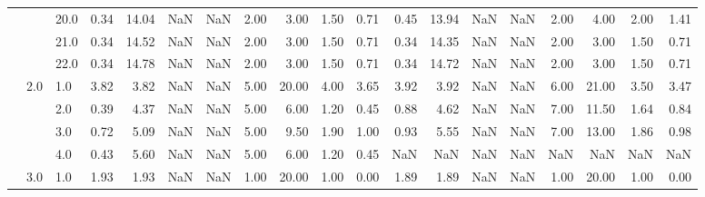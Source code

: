 \begin{tabular}{lllrrrrrrrrrrrrrrrr}
       &     & 20.0 &      0.34 &      14.04 &               NaN &                NaN & 2.00 &   3.00 &             1.50 &                         0.71 &      0.45 &      13.94 &               NaN &                NaN & 2.00 &   4.00 &             2.00 &                         1.41 \\
       &     & 21.0 &      0.34 &      14.52 &               NaN &                NaN & 2.00 &   3.00 &             1.50 &                         0.71 &      0.34 &      14.35 &               NaN &                NaN & 2.00 &   3.00 &             1.50 &                         0.71 \\
       &     & 22.0 &      0.34 &      14.78 &               NaN &                NaN & 2.00 &   3.00 &             1.50 &                         0.71 &      0.34 &      14.72 &               NaN &                NaN & 2.00 &   3.00 &             1.50 &                         0.71 \\
       & 2.0 & 1.0  &      3.82 &       3.82 &               NaN &                NaN & 5.00 &  20.00 &             4.00 &                         3.65 &      3.92 &       3.92 &               NaN &                NaN & 6.00 &  21.00 &             3.50 &                         3.47 \\
       &     & 2.0  &      0.39 &       4.37 &               NaN &                NaN & 5.00 &   6.00 &             1.20 &                         0.45 &      0.88 &       4.62 &               NaN &                NaN & 7.00 &  11.50 &             1.64 &                         0.84 \\
       &     & 3.0  &      0.72 &       5.09 &               NaN &                NaN & 5.00 &   9.50 &             1.90 &                         1.00 &      0.93 &       5.55 &               NaN &                NaN & 7.00 &  13.00 &             1.86 &                         0.98 \\
       &     & 4.0  &      0.43 &       5.60 &               NaN &                NaN & 5.00 &   6.00 &             1.20 &                         0.45 &       NaN &        NaN &               NaN &                NaN &  NaN &    NaN &              NaN &                          NaN \\
       & 3.0 & 1.0  &      1.93 &       1.93 &               NaN &                NaN & 1.00 &  20.00 &             1.00 &                         0.00 &      1.89 &       1.89 &               NaN &                NaN & 1.00 &  20.00 &             1.00 &                         0.00 \\

\end{tabular}
